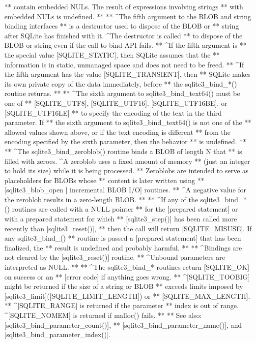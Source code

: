 \begin{Codex}[label=sqlite3.h,numbers=left]
{** contain embedded NULs.  The result of expressions involving strings
** with embedded NULs is undefined.
**
** ^The fifth argument to the BLOB and string binding interfaces
** is a destructor used to dispose of the BLOB or
** string after SQLite has finished with it.  ^The destructor is called
** to dispose of the BLOB or string even if the call to bind API fails.
** ^If the fifth argument is
** the special value [SQLITE_STATIC], then SQLite assumes that the
** information is in static, unmanaged space and does not need to be freed.
** ^If the fifth argument has the value [SQLITE_TRANSIENT], then
** SQLite makes its own private copy of the data immediately, before
** the sqlite3_bind_*() routine returns.
**
** ^The sixth argument to sqlite3_bind_text64() must be one of
** [SQLITE_UTF8], [SQLITE_UTF16], [SQLITE_UTF16BE], or [SQLITE_UTF16LE]
** to specify the encoding of the text in the third parameter.  If
** the sixth argument to sqlite3_bind_text64() is not one of the
** allowed values shown above, or if the text encoding is different
** from the encoding specified by the sixth parameter, then the behavior
** is undefined.
**
** ^The sqlite3_bind_zeroblob() routine binds a BLOB of length N that
** is filled with zeroes.  ^A zeroblob uses a fixed amount of memory
** (just an integer to hold its size) while it is being processed.
** Zeroblobs are intended to serve as placeholders for BLOBs whose
** content is later written using
** [sqlite3_blob_open | incremental BLOB I/O] routines.
** ^A negative value for the zeroblob results in a zero-length BLOB.
**
** ^If any of the sqlite3_bind_*() routines are called with a NULL pointer
** for the [prepared statement] or with a prepared statement for which
** [sqlite3_step()] has been called more recently than [sqlite3_reset()],
** then the call will return [SQLITE_MISUSE].  If any sqlite3_bind_()
** routine is passed a [prepared statement] that has been finalized, the
** result is undefined and probably harmful.
**
** ^Bindings are not cleared by the [sqlite3_reset()] routine.
** ^Unbound parameters are interpreted as NULL.
**
** ^The sqlite3_bind_* routines return [SQLITE_OK] on success or an
** [error code] if anything goes wrong.
** ^[SQLITE_TOOBIG] might be returned if the size of a string or BLOB
** exceeds limits imposed by [sqlite3_limit]([SQLITE_LIMIT_LENGTH]) or
** [SQLITE_MAX_LENGTH].
** ^[SQLITE_RANGE] is returned if the parameter
** index is out of range.  ^[SQLITE_NOMEM] is returned if malloc() fails.
**
** See also: [sqlite3_bind_parameter_count()],
** [sqlite3_bind_parameter_name()], and [sqlite3_bind_parameter_index()].
}
\end{Codex}
